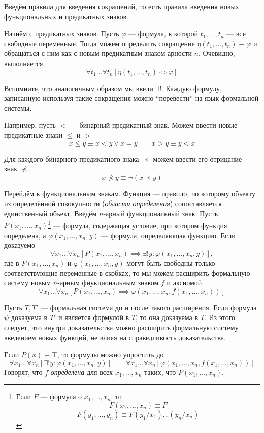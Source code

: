 Введём правила для введения сокращений, то есть правила введения новых функциональных
и предикатных знаков.

Начнём с предикатных знаков. Пусть $\varphi$ --- формула,
в которой $t_1,...,t_{n}$ --- все
свободные переменные. Тогда можем определить сокращение $\eta(t_1,...,t_{n})\equiv\varphi$
и обращаться с ним как с новым предикатным знаком арности $n$.
Очевидно, выполняется
\[
  \forall t_1...\forall t_{n}[\eta(t_1,...,t_{n})\iff\varphi]
\]

Вспомните, что аналогичным образом мы ввели $\exists!$. Каждую формулу,
записанную используя такие сокращения можно
``перевести'' на язык формальной системы.

Например, пусть $<$ --- бинарный предикатный знак.
Можем ввести новые предикатные знаки $\leq$ и $>$
\[
  x\leq y\equiv x<y\lor x=y\qquad x>y\equiv y< x
\]

Для каждого бинарного предикатного знака $\prec$ можем
ввести его отрицание --- знак $\nprec$.
\[
  x\nprec y\equiv \lnot(x\prec y)
\]

Перейдём к функциональным знакам. Функция --- правило, по которому объекту
из определённой совокупности ({\it области определения})
сопоставляется единственный объект.
Введём $n$-арный функциональный знак. Пусть $P(x_1,...,x_{n})$\footnote{
Если $F$ --- формула о $x_1,...,x_{n}$, то
\[
  F(x_1,...,x_{n})\equiv F
\]
\[F(y_1,...,y_{n})\equiv F(y_1/x_1)...(y_{n}/x_{n})\]}
--- формула, содержащая
условие, при котором функция определена, а $\varphi(x_1,...,x_{n},y)$ ---
формула, определяющая функцию. Если доказуемо
\[
  \forall x_1...\forall x_n[P(x_1,...,x_{n})
  \implies \exists! y:\varphi(x_1,...,x_{n},y)],
\]
где в $P(x_1,...,x_{n})$ и $\varphi(x_1,...,x_{n},y)$
могут быть свободны только
соответствующие переменные в скобках,
то мы можем расширить формальную систему новым $n$-арным фнукциональным знаком $f$
и аксиомой
\[
  \forall x_1...\forall x_{n}[P(x_1,...,x_{n})
  \implies \varphi(x_1,...,x_{n},f(x_1,...,x_{n}))]
\]

Пусть $T,T'$ --- формальная система до и после такого расширения.
Если формула $\psi$ доказуема в $T'$ и является формулой в $T$, то она доказуема в $T$.
Из этого следует, что внутри доказательства можно расширить формальную систему
введением новых функций, не влияя на справедливость доказательства.

Если $P(x)\equiv \top$, то формулы можно упростить до
\[
  \forall x_1...\forall x_{n}[\exists !y:\varphi(x_1,...,x_{n},y)]\qquad
  \forall x_1...\forall x_{n}[\varphi(x_1,...,x_{n},f(x_1,...,x_{n}))]
\]
Говорят, что $f$ {\it определена}
для всех $x_1,...,x_{n}$ таких, что $P(x_1,...,x_{n})$.

